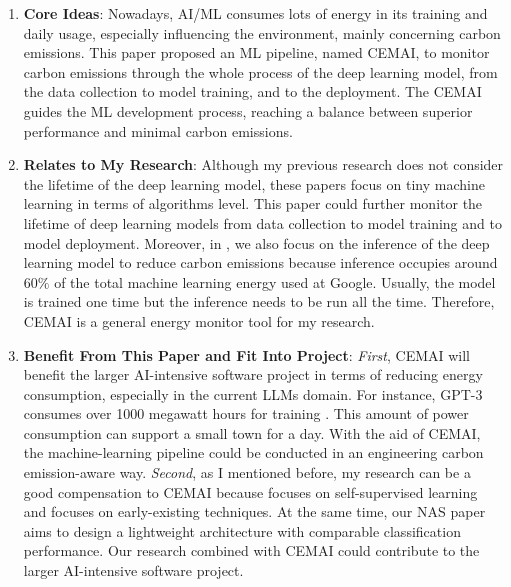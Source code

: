 \documentclass[11pt]{article}
\begin{document}
\begin{enumerate}
  \item \textbf{Core Ideas}: Nowadays, AI/ML consumes lots of energy in its training and daily usage, especially influencing the environment, mainly concerning carbon emissions. This paper proposed an ML pipeline, named CEMAI, to monitor carbon emissions through the whole process of the deep learning model, from the data collection to model training, and to the deployment. The CEMAI guides the ML development process, reaching a balance between superior performance and minimal carbon emissions.
  

  \item \textbf{Relates to My Research}: Although my previous research \cite{huang2023epilepsynet,huang2023lightweight,aminifar2024lightweight} does not consider the lifetime of the deep learning model, these papers focus on tiny machine learning in terms of algorithms level. This paper \cite{husom2024engineering} could further monitor the lifetime of deep learning models from data collection to model training and to model deployment. Moreover, in \cite{aminifar2024lightweight}, we also focus on the inference of the deep learning model to reduce carbon emissions because inference occupies around $60\%$ of the total machine learning energy used at Google. Usually, the model is trained one time but the inference needs to be run all the time. Therefore, CEMAI is a general energy monitor tool for my research.

  
  \item \textbf{Benefit From This Paper and Fit Into Project}: \emph{First}, CEMAI \cite{husom2024engineering} will benefit the larger AI-intensive software project in terms of reducing energy consumption, especially in the current LLMs domain. For instance, GPT-3 consumes over 1000 megawatt hours for training \cite{patterson2021carbon}. This amount of power consumption can support a small town for a day. With the aid of CEMAI, the machine-learning pipeline could be conducted in an engineering carbon emission-aware way. \emph{Second}, as I mentioned before, my research can be a good compensation to CEMAI because \cite{huang2023epilepsynet} focuses on self-supervised learning and \cite{aminifar2024lightweight} focuses on early-existing techniques. At the same time, our \gls{NAS} paper aims to design a lightweight architecture with comparable classification performance. Our research combined with CEMAI could contribute to the larger AI-intensive software project.


\end{enumerate}
\end{document}
